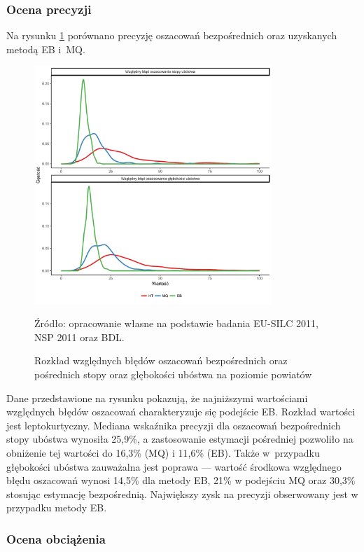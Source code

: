 \subsubsection{Ocena precyzji}

Na rysunku \ref{fig:eb_mq_lvl1_prec} porównano precyzję oszacowań bezpośrednich oraz uzyskanych metodą EB i~MQ.

\begin{figure}[htp]
\centering
\includegraphics[width=0.8\textwidth]{04_wykresy/eb_mq_lvl1_prec-1.pdf}
\caption{Rozkład względnych błędów oszacowań bezpośrednich oraz pośrednich stopy oraz głębokości ubóstwa na poziomie powiatów}
\small{Źródło: opracowanie własne na podstawie badania EU-SILC 2011, NSP 2011 oraz BDL.}
\label{fig:eb_mq_lvl1_prec}
\end{figure}

Dane przedstawione na rysunku pokazują, że najniższymi wartościami względnych błędów oszacowań charakteryzuje się podejście EB. Rozkład wartości jest leptokurtyczny. Mediana wskaźnika precyzji dla oszacowań bezpośrednich stopy ubóstwa wynosiła 25,9\%, a zastosowanie estymacji pośredniej pozwoliło na obniżenie tej wartości do 16,3\% (MQ) i 11,6\% (EB). Także w~przypadku głębokości ubóstwa zauważalna jest poprawa --- wartość środkowa względnego błędu oszacowań wynosi 14,5\% dla metody EB, 21\% w podejściu MQ oraz 30,3\% stosując estymację bezpośrednią. Największy zysk na precyzji obserwowany jest w przypadku metody EB. 

\subsubsection{Ocena obciążenia}

